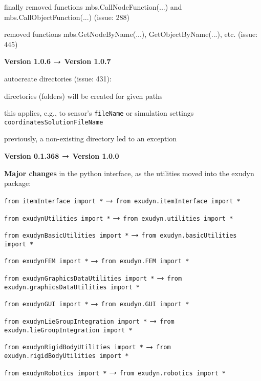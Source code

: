 	\ei
	\item[] finally removed functions mbs.CallNodeFunction(...) and mbs.CallObjectFunction(...) (issue: 288)
	\item[] removed functions mbs.GetNodeByName(...), GetObjectByName(...), etc. (issue: 445)
	\item {\bf Version 1.0.6 $\rightarrow$ Version 1.0.7}
	\item[] autocreate directories (issue: 431):
	\bi %
	\item directories (folders) will be created for given paths
	\item this applies, e.g., to sensor's \texttt{fileName} or simulation settings \texttt{coordinatesSolutionFileName}
	\item previously, a non-existing directory led to an exception
	\ei
	\item {\bf Version 0.1.368 $\rightarrow$ Version 1.0.0}
	\item[] {\bf Major changes} in the python interface, as the utilities moved into the exudyn package:
	\bi \ttfamily
	  \item \texttt{from itemInterface import *} $\rightarrow$ \texttt{from exudyn.itemInterface import *}
	  \item \texttt{from exudynUtilities import *} $\rightarrow$ \texttt{from exudyn.utilities import *}
	  \item \texttt{from exudynBasicUtilities import *} $\rightarrow$ \texttt{from exudyn.basicUtilities import *}
	  \item \texttt{from exudynFEM import *} $\rightarrow$ \texttt{from exudyn.FEM import *}
	  \item \texttt{from exudynGraphicsDataUtilities import *} $\rightarrow$ \texttt{from exudyn.graphicsDataUtilities import *}
	  \item \texttt{from exudynGUI import *} $\rightarrow$ \texttt{from exudyn.GUI import *}
	  \item \texttt{from exudynLieGroupIntegration import *} $\rightarrow$ \texttt{from exudyn.lieGroupIntegration import *}
	  \item \texttt{from exudynRigidBodyUtilities import *} $\rightarrow$ \texttt{from exudyn.rigidBodyUtilities import *}
	  \item \texttt{from exudynRobotics import *} $\rightarrow$ \texttt{from exudyn.robotics import *}
